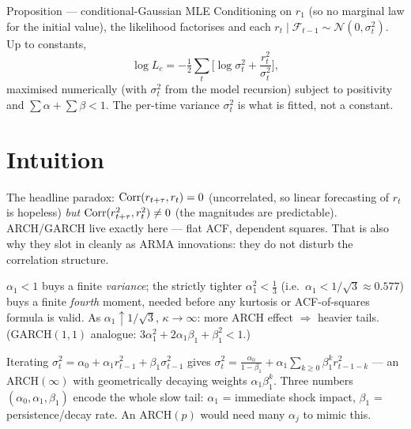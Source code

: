 \documentclass[11pt]{article}
\begin{document}
\begin{result}{Proposition --- conditional-Gaussian MLE}
Conditioning on $r_1$ (so no marginal law for the initial value), the likelihood factorises and
each $r_t\mid\mathcal F_{t-1}\sim\mathcal N(0,\sigma_t^2)$. Up to constants,
\[
\log L_c=-\tfrac12\sum_{t}\Big[\log\sigma_t^2+\frac{r_t^2}{\sigma_t^2}\Big],
\]
maximised numerically (with $\sigma_t^2$ from the model recursion) subject to positivity and
$\sum\alpha+\sum\beta<1$. The per-time variance $\sigma_t^2$ is what is fitted, not a constant.
\end{result}

\section*{Intuition}

\begin{intu}
The headline paradox: $\operatorname{Corr}(r_{t+\tau},r_t)=0$ (uncorrelated, so linear forecasting of $r_t$ is
hopeless) \emph{but} $\operatorname{Corr}(r_{t+\tau}^2,r_t^2)\ne0$ (the magnitudes are predictable). ARCH/GARCH
live exactly here --- flat ACF, dependent squares. That is also why they slot in cleanly as ARMA
innovations: they do not disturb the correlation structure.
\end{intu}

\begin{intu}
$\alpha_1<1$ buys a finite \emph{variance}; the strictly tighter $\alpha_1^2<\tfrac13$ (i.e.\
$\alpha_1<1/\sqrt3\approx0.577$) buys a finite \emph{fourth} moment, needed before any kurtosis or
ACF-of-squares formula is valid. As $\alpha_1\uparrow1/\sqrt3$, $\kappa\to\infty$: more ARCH effect
$\Rightarrow$ heavier tails. (GARCH$(1,1)$ analogue: $3\alpha_1^2+2\alpha_1\beta_1+\beta_1^2<1$.)
\end{intu}

\begin{intu}[GARCH(1,1) $\approx$ ARCH$(\infty)$, but parsimonious]
Iterating $\sigma_t^2=\alpha_0+\alpha_1 r_{t-1}^2+\beta_1\sigma_{t-1}^2$ gives
$\sigma_t^2=\tfrac{\alpha_0}{1-\beta_1}+\alpha_1\sum_{k\ge0}\beta_1^k r_{t-1-k}^2$ --- an
ARCH$(\infty)$ with geometrically decaying weights $\alpha_1\beta_1^k$. Three numbers
$(\alpha_0,\alpha_1,\beta_1)$ encode the whole slow tail: $\alpha_1$ = immediate shock impact,
$\beta_1$ = persistence/decay rate. An ARCH$(p)$ would need many $\alpha_j$ to mimic this.
\end{intu}
\end{document}
